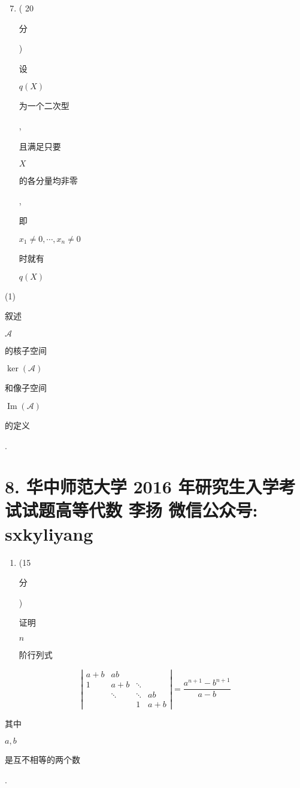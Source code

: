 \documentclass[10pt]{article}
\begin{document}
\begin{enumerate}
  \setcounter{enumi}{6}
  \item ( 20 \begin{CJK}{UTF8}{mj}分\end{CJK}) \begin{CJK}{UTF8}{mj}设\end{CJK} $q(X)$ \begin{CJK}{UTF8}{mj}为一个二次型\end{CJK}, \begin{CJK}{UTF8}{mj}且满足只要\end{CJK} $X$ \begin{CJK}{UTF8}{mj}的各分量均非零\end{CJK}, \begin{CJK}{UTF8}{mj}即\end{CJK} $x_{1} \neq 0, \cdots, x_{n} \neq 0$ \begin{CJK}{UTF8}{mj}时就有\end{CJK} $q(X)$
\end{enumerate}
(1) \begin{CJK}{UTF8}{mj}叙述\end{CJK} $\mathscr{A}$ \begin{CJK}{UTF8}{mj}的核子空间\end{CJK} $\operatorname{ker}(\mathscr{A})$ \begin{CJK}{UTF8}{mj}和像子空间\end{CJK} $\operatorname{Im}(\mathscr{A})$ \begin{CJK}{UTF8}{mj}的定义\end{CJK}.

\section{8. 华中师范大学 2016 年研究生入学考试试题高等代数 
 李扬 
 微信公众号: sxkyliyang}
\begin{enumerate}
  \item (15 \begin{CJK}{UTF8}{mj}分\end{CJK}) \begin{CJK}{UTF8}{mj}证明\end{CJK} $n$ \begin{CJK}{UTF8}{mj}阶行列式\end{CJK}
\end{enumerate}
$$
\left|\begin{array}{cccc}
a+b & a b & & \\
1 & a+b & \ddots & \\
& \ddots & \ddots & a b \\
& & 1 & a+b
\end{array}\right|=\frac{a^{n+1}-b^{n+1}}{a-b}
$$
\begin{CJK}{UTF8}{mj}其中\end{CJK} $a, b$ \begin{CJK}{UTF8}{mj}是互不相等的两个数\end{CJK}.
\end{document}
